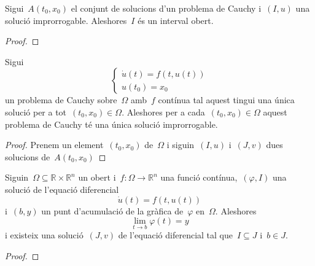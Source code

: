 \documentclass[../../main.tex]{subfiles}
\begin{document}
    \begin{proposition}
        \label{prop:les solucions improrrogables estàn definides sobre intervals oberts}
        Sigui~\(A(t_{0},x_{0})\) el conjunt de solucions d'un problema de Cauchy i~\((I,u)\) una solució improrrogable.
        Aleshores~\(I\) és un interval obert.
        \begin{proof}
%
        \end{proof}
    \end{proposition}
    \begin{proposition}
        \label{prop:la solució improrrogable és única}
        Sigui
        \[\begin{cases}
            \displaystyle \dot{u}(t)=f(t,u(t)) \\
            \displaystyle u(t_{0})=x_{0}
        \end{cases}\]
        un problema de Cauchy sobre~\(\Omega\) amb~\(f\) contínua tal aquest tingui una única solució per a tot~\((t_{0},x_{0})\in\Omega\).
        Aleshores per a cada~\((t_{0},x_{0})\in\Omega\) aquest problema de Cauchy té una única solució improrrogable.
        \begin{proof}
            Prenem un element~\((t_{0},x_{0})\) de~\(\Omega\) i siguin~\((I,u)\) i~\((J,v)\) dues solucions de~\(A(t_{0},x_{0})\)
        \end{proof}
    \end{proposition}
    \begin{theorem}
        \label{thm:Lema de Wintner}
        Siguin~\(\Omega\subseteq\mathbb{R}\times\mathbb{R}^{n}\) un obert i~\(f\colon\Omega\longrightarrow\mathbb{R}^{n}\) una funció contínua,~\((\varphi,I)\) una solució de l'equació diferencial
        \[
            \dot{u}(t)=f(t,u(t))
        \]
        i~\((b,y)\) un punt d'acumulació de la gràfica de~\(\varphi\) en~\(\Omega\).
        Aleshores
        \[
            \lim_{t\to b}\varphi(t)=y
        \]
        i existeix una solució~\((J,v)\) de l'equació diferencial tal que~\(I\subseteq J\) i~\(b\in J\).
        \begin{proof}
        \end{proof}
    \end{theorem}
\end{document}
